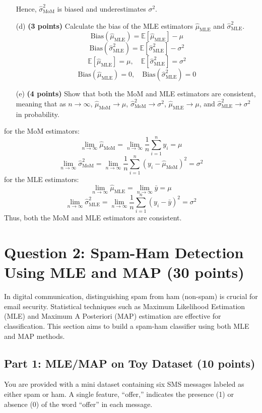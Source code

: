 \documentclass{article}
\begin{document}
\begin{enumerate}
Hence, \( \hat{\sigma}^2_{\text{MoM}} \) is biased and underestimates \( \sigma^2 \).

\item[(d)] \textbf{(3 points)} Calculate the bias of the MLE estimators \(\hat{\mu}_{\text{MLE}}\) and \(\hat{\sigma}^2_{\text{MLE}}\).
\[
\text{Bias}(\hat{\mu}_{\text{MLE}}) = \mathbb{E}[\hat{\mu}_{\text{MLE}}] - \mu
\]
\[
\text{Bias}(\hat{\sigma}^2_{\text{MLE}}) = \mathbb{E}[\hat{\sigma}^2_{\text{MLE}}] - \sigma^2
\]
\[
\mathbb{E}[\hat{\mu}_{\text{MLE}}] = \mu, \quad \mathbb{E}[\hat{\sigma}^2_{\text{MLE}}] = \sigma^2
\]
\[
\text{Bias}(\hat{\mu}_{\text{MLE}}) = 0, \quad \text{Bias}(\hat{\sigma}^2_{\text{MLE}}) = 0
\]
    \item[(e)] \textbf{(4 points)} Show that both the MoM and MLE estimators are consistent, meaning that as \(n \to \infty\), \(\hat{\mu}_{\text{MoM}} \to \mu\), \(\hat{\sigma}^2_{\text{MoM}} \to \sigma^2\), \(\hat{\mu}_{\text{MLE}} \to \mu\), and \(\hat{\sigma}^2_{\text{MLE}} \to \sigma^2\) in probability.
\end{enumerate}
for the MoM estimators:
\[
\lim_{n \to \infty} \hat{\mu}_{\text{MoM}} = \lim_{n \to \infty} \frac{1}{n} \sum_{i=1}^n y_i = \mu
\]
\[
\lim_{n \to \infty} \hat{\sigma}^2_{\text{MoM}} = \lim_{n \to \infty} \frac{1}{n} \sum_{i=1}^n (y_i - \hat{\mu}_{\text{MoM}})^2 = \sigma^2
\]
for the MLE estimators:
\[
\lim_{n \to \infty} \hat{\mu}_{\text{MLE}} = \lim_{n \to \infty} \bar{y} = \mu
\]
\[
\lim_{n \to \infty} \hat{\sigma}^2_{\text{MLE}} = \lim_{n \to \infty} \frac{1}{n} \sum_{i=1}^n (y_i - \bar{y})^2 = \sigma^2
\]
Thus, both the MoM and MLE estimators are consistent.
    
  








\section*{Question 2: Spam-Ham Detection Using MLE and MAP (30 points)}
In digital communication, distinguishing spam from ham (non-spam) is crucial for email security. Statistical techniques such as Maximum Likelihood Estimation (MLE) and Maximum A Posteriori (MAP) estimation are effective for classification. This section aims to build a spam-ham classifier using both MLE and MAP methods.

\subsection*{Part 1: MLE/MAP on Toy Dataset (10 points)}
You are provided with a mini dataset containing six SMS messages labeled as either spam or ham. A single feature, ``offer,'' indicates the presence (1) or absence (0) of the word ``offer'' in each message.
\end{document}
